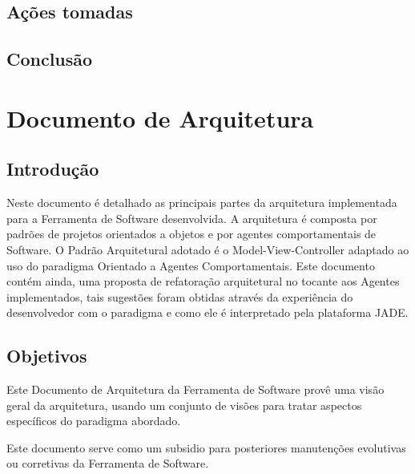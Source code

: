 \begin{apendicesenv}
\begin{center}
\begin{longtable}{| p{4cm} | p{4cm} |p{4cm} |p{2cm} |}
\label{t1}
\end{longtable}
\end{center}


\section{Ações  tomadas} 

\section{Conclusão} 

\chapter[DOCUMENTO DE ARQUITETURA]{Documento de Arquitetura}
\section{Introdução}

Neste documento é detalhado as principais partes da arquitetura implementada para a Ferramenta de Software desenvolvida.  A arquitetura é composta por padrões de projetos orientados a objetos e por agentes comportamentais de Software. O Padrão Arquitetural adotado é o Model-View-Controller adaptado ao uso do paradigma Orientado a Agentes Comportamentais. Este documento contém ainda, uma proposta de refatoração arquitetural no tocante aos Agentes implementados, tais sugestões foram obtidas através da experiência do desenvolvedor com o paradigma e como ele é interpretado pela plataforma JADE.

\section{Objetivos}

Este Documento de Arquitetura da Ferramenta de Software provê uma visão geral da arquitetura, usando um conjunto de visões para tratar aspectos específicos do paradigma abordado. 

Este documento serve como um subsidio para posteriores manutenções evolutivas ou corretivas da Ferramenta de Software.




\end{apendicesenv}
